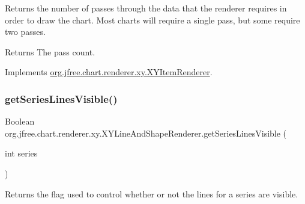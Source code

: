 Returns the number of passes through the data that the renderer requires in order to draw the chart. Most charts will require a single pass, but some require two passes.

\begin{DoxyReturn}{Returns}
The pass count. 
\end{DoxyReturn}


Implements \mbox{\hyperlink{interfaceorg_1_1jfree_1_1chart_1_1renderer_1_1xy_1_1_x_y_item_renderer_afe42489776da2a4c7e64838382bbaea1}{org.\+jfree.\+chart.\+renderer.\+xy.\+X\+Y\+Item\+Renderer}}.

\mbox{\label{classorg_1_1jfree_1_1chart_1_1renderer_1_1xy_1_1_x_y_line_and_shape_renderer_a12d61d772cadf4553c06817d8dab579a}} 
\subsubsection{\texorpdfstring{get\+Series\+Lines\+Visible()}{getSeriesLinesVisible()}}
{\footnotesize\ttfamily Boolean org.\+jfree.\+chart.\+renderer.\+xy.\+X\+Y\+Line\+And\+Shape\+Renderer.\+get\+Series\+Lines\+Visible (\begin{DoxyParamCaption}\item[{int}]{series }\end{DoxyParamCaption})}

Returns the flag used to control whether or not the lines for a series are visible.


